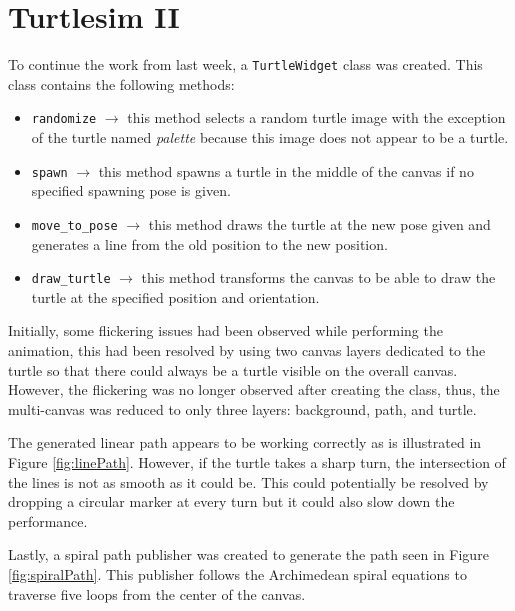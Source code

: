     \section{Turtlesim II}
    
        To continue the work from last week, a \texttt{TurtleWidget} class was created. This class contains the following methods:
        \begin{itemize}
            \item \texttt{randomize} $\rightarrow$ this method selects a random turtle image with the exception of the turtle named \textit{palette} because this image does not appear to be a turtle.
            \item \texttt{spawn} $\rightarrow$ this method spawns a turtle in the middle of the canvas if no specified spawning pose is given.
            \item \texttt{move\_to\_pose} $\rightarrow$ this method draws the turtle at the new pose given and generates a line from the old position to the new position.
            \item \texttt{draw\_turtle} $\rightarrow$ this method transforms the canvas to be able to draw the turtle at the specified position and orientation.
        \end{itemize}
        
        Initially, some flickering issues had been observed while performing the animation, this had been resolved by using two canvas layers dedicated to the turtle so that there could always be a turtle visible on the overall canvas. However, the flickering was no longer observed after creating the class, thus, the multi-canvas was reduced to only three layers: background, path, and turtle.
        
        The generated linear path appears to be working correctly as is illustrated in Figure \ref{fig:linePath}. However, if the turtle takes a sharp turn, the intersection of the lines is not as smooth as it could be. This could potentially be resolved by dropping a circular marker at every turn but it could also slow down the performance.
        
        Lastly, a spiral path publisher was created to generate the path seen in Figure \ref{fig:spiralPath}. This publisher follows the Archimedean spiral equations to traverse five loops from the center of the canvas.
        
